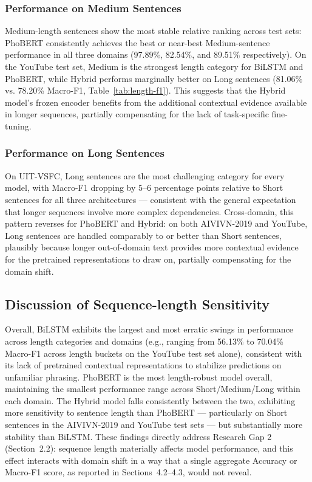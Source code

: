 \documentclass[12pt]{report} %
\begin{document}
\subsubsection{Performance on Medium Sentences}
Medium-length sentences show the most stable relative ranking across test sets: PhoBERT consistently achieves the best or near-best Medium-sentence performance in all three domains (97.89\%, 82.54\%, and 89.51\% respectively). On the YouTube test set, Medium is the strongest length category for BiLSTM and PhoBERT, while Hybrid performs marginally better on Long sentences (81.06\% vs. 78.20\% Macro-F1, Table~\ref{tab:length-f1}). This suggests that the Hybrid model's frozen encoder benefits from the additional contextual evidence available in longer sequences, partially compensating for the lack of task-specific fine-tuning.

\subsubsection{Performance on Long Sentences}
On UIT-VSFC, Long sentences are the most challenging category for every model, with Macro-F1 dropping by 5--6 percentage points relative to Short sentences for all three architectures --- consistent with the general expectation that longer sequences involve more complex dependencies. Cross-domain, this pattern reverses for PhoBERT and Hybrid: on both AIVIVN-2019 and YouTube, Long sentences are handled comparably to or better than Short sentences, plausibly because longer out-of-domain text provides more contextual evidence for the pretrained representations to draw on, partially compensating for the domain shift.

\subsection{Discussion of Sequence-length Sensitivity}
Overall, BiLSTM exhibits the largest and most erratic swings in performance across length categories and domains (e.g., ranging from 56.13\% to 70.04\% Macro-F1 across length buckets on the YouTube test set alone), consistent with its lack of pretrained contextual representations to stabilize predictions on unfamiliar phrasing. PhoBERT is the most length-robust model overall, maintaining the smallest performance range across Short/Medium/Long within each domain. The Hybrid model falls consistently between the two, exhibiting more sensitivity to sentence length than PhoBERT --- particularly on Short sentences in the AIVIVN-2019 and YouTube test sets --- but substantially more stability than BiLSTM. These findings directly address Research Gap 2 (Section~2.2): sequence length materially affects model performance, and this effect interacts with domain shift in a way that a single aggregate Accuracy or Macro-F1 score, as reported in Sections~4.2--4.3, would not reveal.
\end{document}
